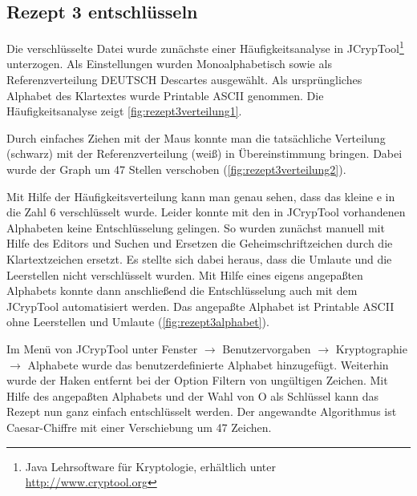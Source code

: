 \subsection{Rezept 3 entschlüsseln}
\label{RezeptDreiEntschluesseln}

Die verschlüsselte Datei wurde zunächste einer Häufigkeitsanalyse in
JCrypTool\footnote{Java Lehrsoftware für Kryptologie, erhältlich unter
  \url{http://www.cryptool.org}} unterzogen. Als Einstellungen wurden
\glqq{}Monoalphabetisch\grqq{} sowie als Referenzverteilung \glqq{}DEUTSCH Descartes\grqq{}
ausgewählt. Als ursprüngliches Alphabet des Klartextes wurde \glqq{}Printable ASCII\grqq{} 
genommen. Die Häufigkeitsanalyse zeigt \cref{fig:rezept3verteilung1}.


Durch einfaches Ziehen mit der Maus konnte man die tatsächliche Verteilung
(schwarz) mit der Referenzverteilung (weiß) in Übereinstimmung bringen. Dabei
wurde der Graph um 47 Stellen verschoben (\cref{fig:rezept3verteilung2}).


Mit Hilfe der Häufigkeitsverteilung kann man genau sehen, dass das kleine \glqq{}e\grqq{} 
in die Zahl \glqq{}6\grqq{} verschlüsselt wurde. Leider konnte mit den in JCrypTool
vorhandenen Alphabeten keine Entschlüsselung gelingen. So wurden zunächst
manuell mit Hilfe des Editors und Suchen und Ersetzen die Geheimschriftzeichen
durch die Klartextzeichen ersetzt. Es stellte sich dabei heraus, dass die
Umlaute und die Leerstellen nicht verschlüsselt wurden. Mit Hilfe eines eigens
angepaßten Alphabets konnte dann anschließend die Entschlüsselung auch mit dem
JCrypTool automatisiert werden. Das angepaßte Alphabet ist Printable ASCII ohne
Leerstellen und Umlaute (\cref{fig:rezept3alphabet}).


Im Menü von JCrypTool unter Fenster $\rightarrow$ Benutzervorgaben $\rightarrow$
Kryptographie $\rightarrow$ Alphabete wurde das benutzerdefinierte Alphabet
hinzugefügt. Weiterhin wurde der Haken entfernt bei der Option \glqq{}Filtern von
ungültigen Zeichen\grqq{}.  Mit Hilfe des angepaßten Alphabets und der Wahl von \glqq{}O\grqq{}
als Schlüssel kann das Rezept nun ganz einfach entschlüsselt werden.  Der
angewandte Algorithmus ist Caesar-Chiffre mit einer Verschiebung um 47 Zeichen.
